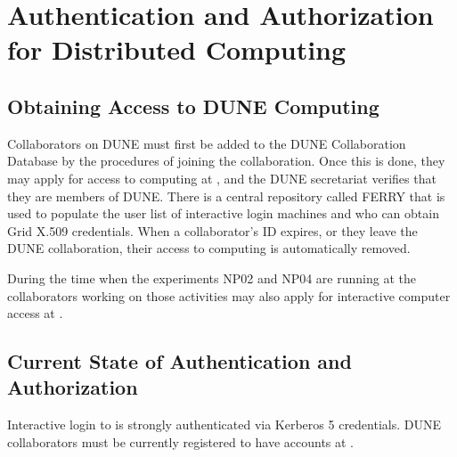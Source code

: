 \documentclass[../main-v1.tex]{subfiles}
\begin{document}
\chapter{Authentication and Authorization for Distributed Computing}
\label{ch:auth}

\section{Obtaining Access to DUNE Computing}
\label{sec:auth:access}
Collaborators on DUNE must first be added to the DUNE Collaboration Database by the procedures of joining the collaboration.
Once this is done, they may apply for access to computing at , and the DUNE secretariat verifies that they
are members of DUNE.  There is a central repository called FERRY that is used to populate the user list of
 interactive login machines and  who can obtain Grid X.509 credentials.
 When a collaborator's  ID expires, or they leave the DUNE collaboration, their access to computing is automatically removed.
 
 During the time when the  experiments NP02 and NP04 are running at the  %
 collaborators %
 working on those activities may also apply %
 for interactive computer access at .

\section{Current State of Authentication and Authorization}
Interactive login to  is strongly authenticated via Kerberos 5 credentials.  %
DUNE collaborators must be currently registered to have accounts at .
\end{document}

